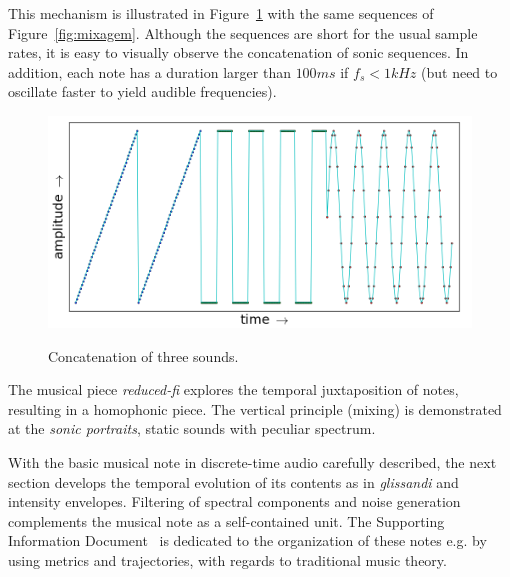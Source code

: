 This mechanism is illustrated in Figure~\ref{fig:concatenacao} with the same sequences of Figure~\ref{fig:mixagem}. Although the sequences are short for the usual sample rates, it is easy to visually observe the concatenation of sonic sequences. In addition, each note has  a duration larger than $100ms$ if $f_s<1kHz$ (but need to oscillate faster to yield audible frequencies).

\begin{figure}[h!]
{    \centering
        \includegraphics[width=.5\columnwidth]{figures/concatenacao__}}
    \caption{Concatenation of three sounds.}
        \label{fig:concatenacao}
\end{figure}

The musical piece \emph{reduced-fi} explores the temporal juxtaposition of notes, resulting in a homophonic piece.
The vertical principle (mixing) is demonstrated at the \emph{sonic portraits}, static sounds with peculiar spectrum.~\cite{MASSA}

With the basic musical note in discrete-time audio carefully described, the next section develops the temporal evolution of its contents as in \emph{glissandi} and intensity envelopes. Filtering of spectral components and noise generation complements the musical note as a self-contained unit. The Supporting Information Document~\cite{massNotesInMusic} is dedicated to the organization of these notes e.g. by using metrics and trajectories, with regards to traditional music theory.


